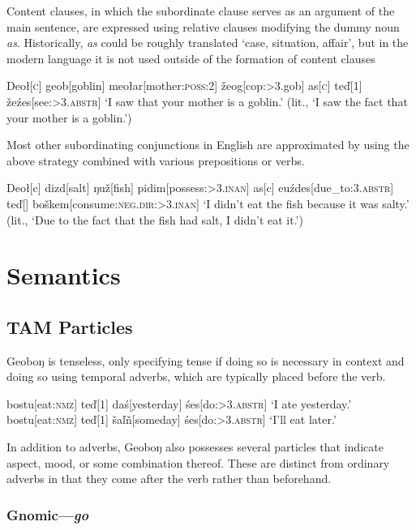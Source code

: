 \documentclass[10pt]{article}
\newcommand{\sk}{\textsc}
\newcommand{\vd}{ď}
\newcommand{\vz}{ž}
\newcommand{\vs}{š}
\newcommand{\vl}{ľ}
\newcommand{\vn}{ň}
\newcommand{\engma}{ŋ}
\begin{document}
Content clauses, in which the subordinate clause serves as an argument of the main sentence, are expressed using relative clauses modifying the dummy noun \textit{as}. Historically, \textit{as} could be roughly translated `case, situation, affair', but in the modern language it is not used outside of the formation of content clauses

\ex
\begingl
Deo{\l}[\sk{c}] 
geob[goblin]
meo\l ar[mother:\sk{poss:2}]
\vz eog[\sc cop:>3.gob]
\nogloss{,}
as[\sk{c}]
te{\vd}[1]
\vz e\'zes[see:\sk{>3.abstr}]
\glft `I saw that your mother is a goblin.' (lit., `I saw the fact that your mother is a goblin.')
\endgl
\xe

Most other subordinating conjunctions in English are approximated by using the above strategy combined with various prepositions or verbs.

\ex 
\begingl
Deo\l[\sc c]
dizd[salt]
\engma u\vz[fish]
pidim[possess:\sk{>3.inan}]
\nogloss{,}
as[\sc c]
euźdes[due\_to:\sk{3.abstr}]
te\vd[] 
bo\vs kem[consume:\sk{neg.dir:>3.inan}]
\glft `I didn't eat the fish because it was salty.' (lit., `Due to the fact that the fish had salt, I didn't eat it.')
\endgl
\xe 

\section{Semantics}

\subsection{TAM Particles}

Geobo{\engma} is tenseless, only specifying tense if doing so is necessary in context and doing so using temporal adverbs, which are typically placed before the verb.

\pex 
\a 
\begingl 
bostu[eat:\sk{nmz}]
te\vd[1]
da\'s[yesterday]
\'ses[do:\sk{>3.abstr}]
\glft `I ate yesterday.'
\endgl
\a 
\begingl 
bostu[eat:\sk{nmz}]
te\vd[1]
\vs a\vl\vn[someday]
\'ses[do:\sk{>3.abstr}]
\glft `I'll eat later.'
\endgl 
\xe

In addition to adverbs, Geobo{\engma} also possesses several particles that indicate aspect, mood, or some combination thereof. These are distinct from ordinary adverbs in that they come after the verb rather than beforehand.

\subsubsection{Gnomic---\textit{go}}
\end{document}
